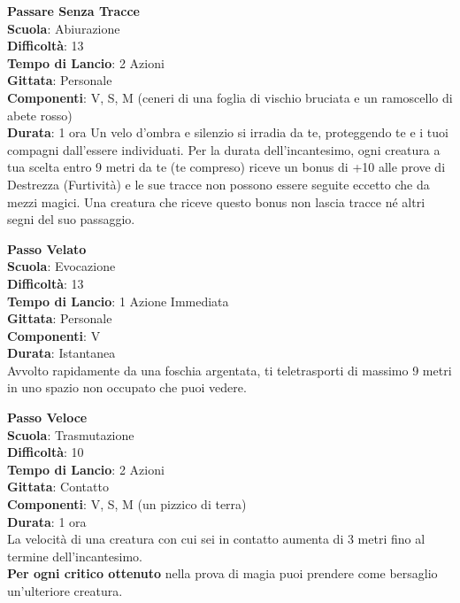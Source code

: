 \begin{multicols}{2}
\medskip\textbf{Passare Senza Tracce}\\
\textbf{Scuola}: Abiurazione\\
\textbf{Difficoltà}:  13\\
\textbf{Tempo di Lancio}: 2 Azioni\\
\textbf{Gittata}: Personale\\
\textbf{Componenti}: V, S, M (ceneri di una foglia di vischio bruciata e un ramoscello di abete rosso)\\
\textbf{Durata}: 1 ora
Un velo d’ombra e silenzio si irradia da te, proteggendo te e i tuoi compagni dall'essere individuati. Per la durata dell'incantesimo, ogni creatura a tua scelta entro 9 metri da te (te compreso) riceve un bonus di +10 alle prove di Destrezza (Furtività) e le sue tracce non possono essere seguite eccetto che da mezzi magici. Una creatura che riceve questo bonus non lascia tracce né altri segni del suo passaggio.

\medskip\textbf{Passo Velato}\\
\textbf{Scuola}: Evocazione\\
\textbf{Difficoltà}:  13\\
\textbf{Tempo di Lancio}: 1 Azione Immediata\\
\textbf{Gittata}: Personale\\
\textbf{Componenti}: V\\
\textbf{Durata}: Istantanea\\
Avvolto rapidamente da una foschia argentata, ti teletrasporti di massimo 9 metri in uno spazio non occupato che puoi vedere.

\medskip\textbf{Passo Veloce}\\
\textbf{Scuola}: Trasmutazione\\
\textbf{Difficoltà}:  10\\
\textbf{Tempo di Lancio}: 2 Azioni\\
\textbf{Gittata}: Contatto\\
\textbf{Componenti}: V, S, M (un pizzico di terra)\\
\textbf{Durata}: 1 ora\\
La velocità di una creatura con cui sei in contatto aumenta di 3 metri fino al termine dell'incantesimo. \\
\textbf{Per ogni critico ottenuto} nella prova di magia puoi prendere come bersaglio un'ulteriore creatura.


\end{multicols}
